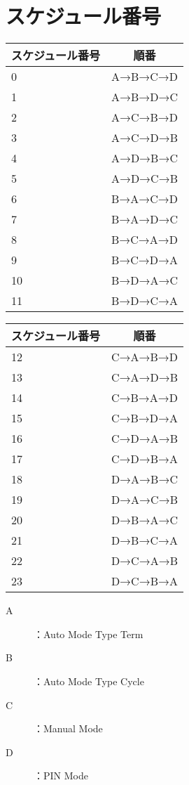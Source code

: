 \section{スケジュール番号}\label{apdx:schedule}
\begin{table}[ht]
  \begin{minipage}{0.5\hsize}
    \begin{center}
      \small
      \begin{tabular}{l|c} \hline
        スケジュール番号 & 順番 \\ \hline
        0 & A→B→C→D \\
        1 & A→B→D→C \\
        2 & A→C→B→D \\
        3 & A→C→D→B \\
        4 & A→D→B→C \\
        5 & A→D→C→B \\
        6 & B→A→C→D \\
        7 & B→A→D→C \\
        8 & B→C→A→D \\
        9 & B→C→D→A \\
        10 & B→D→A→C \\
        11 & B→D→C→A \\ \hline
      \end{tabular}
    \end{center}
  \end{minipage}
  \begin{minipage}{0.5\hsize}
    \begin{center}
      \small
      \begin{tabular}{l|c} \hline
        スケジュール番号 & 順番 \\ \hline
        12 & C→A→B→D \\
        13 & C→A→D→B \\
        14 & C→B→A→D \\
        15 & C→B→D→A \\
        16 & C→D→A→B \\
        17 & C→D→B→A \\
        18 & D→A→B→C \\
        19 & D→A→C→B \\
        20 & D→B→A→C \\
        21 & D→B→C→A \\
        22 & D→C→A→B \\
        23 & D→C→B→A \\ \hline
      \end{tabular}
    \end{center}
  \end{minipage}
\end{table}
\begin{description}
  \item[A]：Auto Mode Type Term
  \item[B]：Auto Mode Type Cycle
  \item[C]：Manual Mode
  \item[D]：PIN Mode
\end{description}

